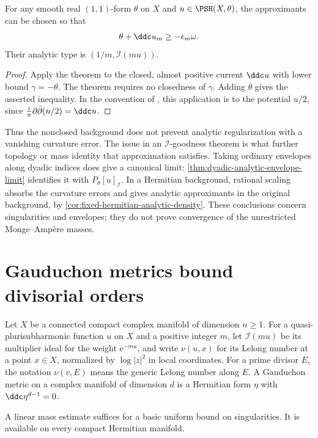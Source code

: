 \begin{corollary}\label{cor:nonclosed-analytic-approximation}
For any smooth real $(1,1)$-form $\theta$ on $X$ and $u\in\PSH(X,\theta)$, the approximants can be chosen so that
\[
 \theta+\ddc u_m\geq-\epsilon_m\omega.
\]
Their analytic type is $(1/m,\mathcal I(mu))$.
\end{corollary}
\begin{proof}
Apply the theorem to the closed, almost positive current $\ddc u$ with lower bound $\gamma=-\theta$. The theorem requires no closedness of $\gamma$. Adding $\theta$ gives the asserted inequality. In the convention of \cite{DemAM11}, this application is to the potential $u/2$, since $\frac{\mathrm{i}}{\pi}\partial\bar\partial(u/2)=\ddc u$.
\end{proof}

Thus the nonclosed background does not prevent analytic regularization with a vanishing curvature error. The issue in an $\mathcal I$-goodness theorem is what further topology or mass identity that approximation satisfies. Taking ordinary envelopes along dyadic indices does give a canonical limit: \cref{thm:dyadic-analytic-envelope-limit} identifies it with $P_\theta[u]_{\mathcal I}$. In a Hermitian background, rational scaling absorbs the curvature errors and gives analytic approximants in the original background, by \cref{cor:fixed-hermitian-analytic-density}. These conclusions concern singularities and envelopes; they do not prove convergence of the unrestricted Monge--Amp\`ere masses.

\section{Gauduchon metrics bound divisorial orders}

Let $X$ be a connected compact complex manifold of dimension $n\geq1$. For a quasi-plurisubharmonic function $u$ on $X$ and a positive integer $m$, let $\mathcal I(mu)$ be its multiplier ideal for the weight $\mathrm{e}^{-mu}$, and write $\nu(u,x)$ for its Lelong number at a point $x\in X$, normalized by $\log|z|^2$ in local coordinates. For a prime divisor $E$, the notation $\nu(v,E)$ means the generic Lelong number along $E$. A Gauduchon metric on a complex manifold of dimension $d$ is a Hermitian form $\eta$ with $\ddc\eta^{d-1}=0$.

A linear mass estimate suffices for a basic uniform bound on singularities. It is available on every compact Hermitian manifold.


